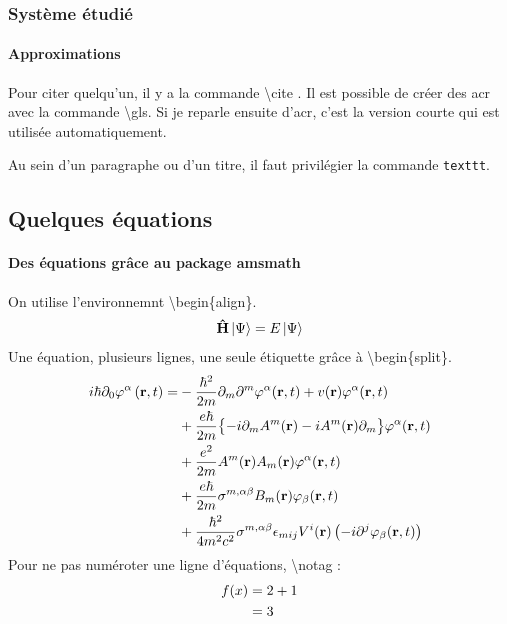 \documentclass[11pt]{article}
\begin{document}
\subsubsection{Système étudié}

\paragraph{Approximations}

Pour citer quelqu'un, il y a la commande \textbackslash cite \cite{marzariMaximallyLocalizedWannier2012}. Il est possible de créer des \gls{acr} avec la commande \textbackslash gls. Si je reparle ensuite d'\gls{acr}, c'est la version courte qui est utilisée automatiquement.

Au sein d'un paragraphe ou d'un titre, il faut privilégier la commande \texttt{texttt}.

\subsection{Quelques équations}\label{sec:equations}
\paragraph{Des équations grâce au package amsmath}

On utilise l'environnemnt \textbackslash begin\{align\}.
\begin{align}
		\vu{H}\ket{\Psi} = E \ket{\Psi}
\end{align}
Une équation, plusieurs lignes, une seule étiquette grâce à \textbackslash begin\{split\}.
\begin{align}
	\begin{split} \label{eq:Kohn Sham}
	i\hbar\partial_0\varphi^\alpha \left( \vb{r},t \right) = &-\frac{\hbar^2}{2m}\partial_m\partial^m\varphi^\alpha(\vb{r},t)+v(\vb{r})\varphi^\alpha(\vb{r},t) \\
		&+ \frac{e\hbar}{2m} \qty\big{ -i\partial_mA^m(\vb{r})-iA^m(\vb{r})\partial_m }\varphi^\alpha(\vb{r},t) \\
		&+ \frac{e^2}{2m}A^m(\vb{r})A_m(\vb{r})\varphi^\alpha(\vb{r},t) \\
		&+\frac{e\hbar}{2m}\sigma^{m,\alpha\beta}B_m(\vb{r})\varphi_\beta(\vb{r},t) \\
		&+\frac{\hbar^2}{4m^2c^2}\sigma^{m,\alpha\beta}\epsilon_{mij}V^i(\vb{r})\left(-i\partial^j\varphi_\beta(\vb{r},t)\right)
	\end{split}
\end{align}
Pour ne pas numéroter une ligne d'équations, \textbackslash notag :
\begin{align}
	f(x) 	&= 2 + 1 \notag \\
			&= 3
\end{align}
\end{document}
